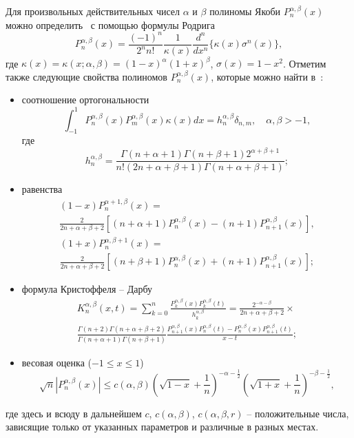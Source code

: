 Для произвольных действительных чисел $\alpha$ и $\beta$ полиномы Якоби $P_n^{\alpha,\beta}(x)$ можно определить~\cite{Ram-Sege} с помощью формулы Родрига
$$
P_n^{\alpha,\beta}(x)=\frac{(-1)^n}{2^nn!}\frac{1}{\kappa(x)}\frac{d^n}{dx^n}\{\kappa(x)\sigma^n(x)\},
$$
где $\kappa(x)=\kappa(x;\alpha,\beta)=(1-x)^\alpha(1+x)^\beta$, $\sigma(x)=1-x^2$. Отметим также следующие свойства полиномов $P_n^{\alpha,\beta}(x)$, которые можно найти в~\cite{Ram-Sege}:
\begin{itemize}
	\item
	соотношение ортогональности
	$$
	\int_{-1}^{1}P_n^{\alpha,\beta}(x)P_m^{\alpha,\beta}(x)\kappa(x)dx=h_n^{\alpha,\beta}\delta_{n,m},\quad \alpha, \beta>-1,
	$$
	где
	$$
	h_n^{\alpha,\beta}=\frac{\Gamma(n+\alpha+1)\Gamma(n+\beta+1)2^{\alpha+\beta+1}}{n!(2n+\alpha+\beta+1)\Gamma(n+\alpha+\beta+1)};
	$$
	
	\item
	равенства
	\begin{multline}\label{alpha_1}
		(1-x)P_n^{\alpha+1,\beta}(x)=\\
		\frac{2}{2n+\alpha+\beta+2}\left[(n+\alpha+1)P_n^{\alpha,\beta}(x)-(n+1)P_{n+1}^{\alpha,\beta}(x)\right],
	\end{multline}
	\begin{multline}\label{beta_1}
		(1+x)P_n^{\alpha,\beta+1}(x)=\\
		\frac{2}{2n+\alpha+\beta+2}\left[(n+\beta+1)P_n^{\alpha,\beta}(x)+(n+1)P_{n+1}^{\alpha,\beta}(x)\right];
	\end{multline}
	
	\item
	формула Кристоффеля -- Дарбу
	\begin{multline}\label{Kris_Dar}
		K_n^{\alpha,\beta}(x,t)=\sum_{k=0}^{n}\frac{P_k^{\alpha,\beta}(x)P_k^{\alpha,\beta}(t)}{h_k^{\alpha,\beta}}=\frac{2^{-\alpha-\beta}}{2n+\alpha+\beta+2}\times\\
		\frac{\Gamma(n+2)\Gamma(n+\alpha+\beta+2)}{\Gamma(n+\alpha+1)\Gamma(n+\beta+1)}
		\frac{P_{n+1}^{\alpha,\beta}(x)P_n^{\alpha,\beta}(t)-P_n^{\alpha,\beta}(x)P_{n+1}^{\alpha,\beta}(t)}{x-t};
	\end{multline}
	
	\item
	весовая оценка ($-1\le x\le1$)
	\begin{equation*}
		\sqrt{n}|P_n^{\alpha,\beta}(x)|\le c(\alpha,\beta)\left(\sqrt{1-x}+\frac{1}{n}\right)^{-\alpha-\frac12}
		\left(\sqrt{1+x}+\frac{1}{n}\right)^{-\beta-\frac12},
	\end{equation*}
\end{itemize}
где здесь и всюду в дальнейшем $c$, $c(\alpha,\beta)$, $c(\alpha,\beta,r)$ -- положительные числа, зависящие только от указанных параметров и различные в разных местах.

